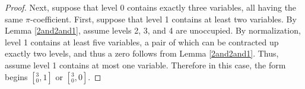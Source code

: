 \documentclass[12pt]{amsart}
\begin{document}
\begin{proof}


Next, suppose that level 0 contains exactly three variables,  all having the same $\pi$-coefficient.  First, suppose that level 1 contains at least two variables.  By Lemma \ref{2and2and1}, assume levels 2, 3, and 4 are unoccupied.  By normalization, level 1 contains at least five variables, a pair of which can be contracted up exactly two levels, and thus a zero follows from Lemma \ref{2and2and1}.  Thus, assume level 1 contains at most one variable.  Therefore in this case, the form begins $[{}^3_0,1]$ or $[{}^3_0,0]$.





\end{proof}
\end{document}
